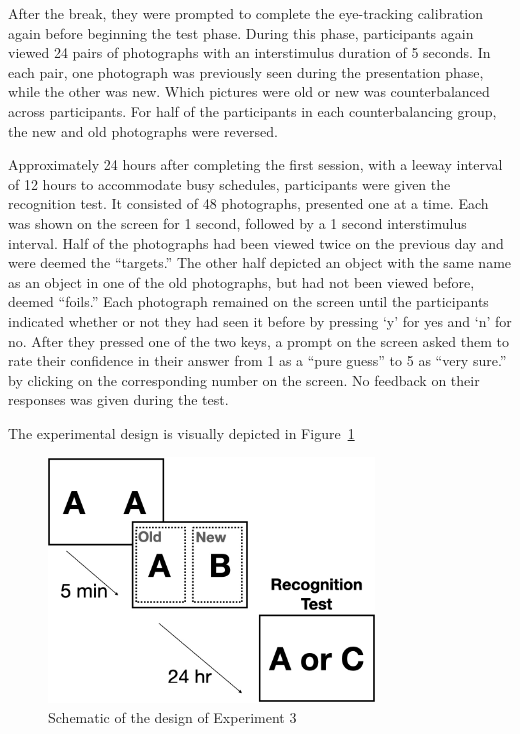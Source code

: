 \documentclass[
  man,floatsintext]{apa6}
\begin{document}
After the break, they were prompted to complete the eye-tracking
calibration again before beginning the test phase. During this phase,
participants again viewed 24 pairs of photographs with an interstimulus
duration of 5 seconds. In each pair, one photograph was previously seen
during the presentation phase, while the other was new. Which pictures
were old or new was counterbalanced across participants.
For half of the participants in each counterbalancing group, the new and
old photographs were
reversed.

Approximately 24 hours after completing the first session, with a leeway
interval of 12 hours to accommodate busy schedules, participants were
given the recognition test. It consisted of 48 photographs, presented
one at a time. Each was shown on the screen for 1 second, followed by a
1 second interstimulus interval. Half of the photographs had been
viewed twice on the previous day and were deemed the ``targets.'' The
other half depicted an object with the same name as an object in one of
the old photographs, but had not been viewed before, deemed ``foils.''
Each photograph remained on the screen until the participants indicated
whether or not they had seen it before by pressing `y' for yes and `n'
for no. After they pressed one of the two keys, a prompt on the screen
asked them to rate their confidence in their answer from 1 as a ``pure
guess'' to 5 as ``very sure.'' by clicking on the corresponding number on
the screen. No feedback on their responses was given during the test.

The experimental design is visually depicted in Figure~\ref{fig:E3-design-schematic}

\begin{figure}
\includegraphics[width=3.41in]{group-c/E3-example-figure} \caption{Schematic of the design of Experiment 3}\label{fig:E3-design-schematic}
\end{figure}
\end{document}
